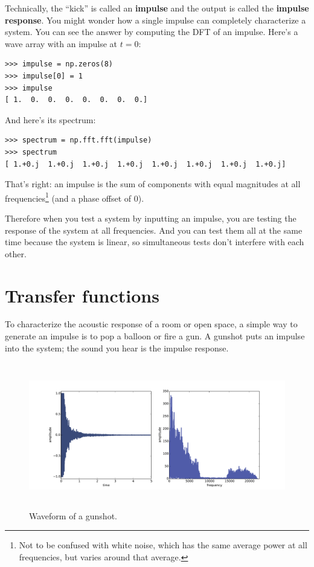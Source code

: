 \documentclass[12pt]{book}
\begin{document}
Technically, the ``kick'' is called an {\bf impulse} and the
output is called the {\bf impulse response}.  You might wonder
how a single impulse can completely characterize a system.  You
can see the answer by computing the DFT of an impulse.  Here's
a wave array with an impulse at $t=0$:

\begin{verbatim}
>>> impulse = np.zeros(8)
>>> impulse[0] = 1
>>> impulse
[ 1.  0.  0.  0.  0.  0.  0.  0.]
\end{verbatim}

And here's its spectrum:

\begin{verbatim}
>>> spectrum = np.fft.fft(impulse)
>>> spectrum
[ 1.+0.j  1.+0.j  1.+0.j  1.+0.j  1.+0.j  1.+0.j  1.+0.j  1.+0.j]
\end{verbatim}

That's right: an impulse is the sum of components with equal
magnitudes at all frequencies\footnote{Not to be confused with white
  noise, which has the same average power at all frequencies, but
  varies around that average.} (and a phase offset of 0).

Therefore when you test a system by inputting
an impulse, you are testing the response of the 
system at all frequencies.  And you can test them all at the same
time because the system is linear, so simultaneous tests don't
interfere with each other.


\section{Transfer functions}

To characterize the acoustic response of a room or open space, a
simple way to generate an impulse is to pop a balloon or
fire a gun.  A gunshot puts an impulse into
the system; the sound you hear is the impulse response.

\begin{figure}
\centerline{\includegraphics[height=2.5in]{figs/systems6.pdf}}
\caption{Waveform of a gunshot.}
\label{fig.systems6}
\end{figure}
\end{document}
